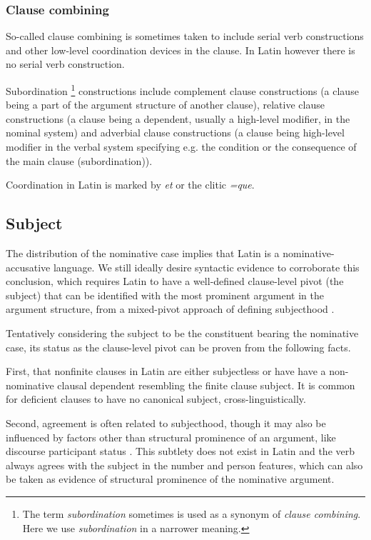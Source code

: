 \documentclass[a4paper, oneside, 12pt]{report}
\newcommand*{\term}[1]{\emph{#1}}
\newcommand{\form}[1]{\emph{#1}}
\begin{document}
\subsubsection{Clause combining}\label{sec:grammatical.clause.clause-combine}

So-called clause combining is sometimes taken to include serial verb constructions and other low-level coordination devices in the clause.
In Latin however there is no serial verb construction.

Subordination%
\footnote{
    The term \term{subordination} sometimes is used as a synonym of \term{clause combining}.
    Here we use \term{subordination} in a narrower meaning.
} constructions include complement clause constructions (a clause being a part of the argument structure of another clause), relative clause constructions (a clause being a dependent, usually a high-level modifier, in the nominal system) and adverbial clause constructions (a clause being high-level modifier in the verbal system specifying e.g. the condition or the consequence of the main clause (subordination)).

Coordination in Latin is marked by \form{et} or the clitic \form{=que}.


\subsection{Subject}\label{sec:grammatical.clause.subject} 

The distribution of the nominative case implies that Latin is a nominative-accusative language.
We still ideally desire syntactic evidence to corroborate this conclusion,
which requires Latin to have a well-defined clause-level pivot (the subject)
that can be identified with the most prominent argument in the argument structure,
from a mixed-pivot approach of defining subjecthood \citep{aldridge2008generative}.

Tentatively considering the subject to be the constituent bearing the nominative case,
its status as the clause-level pivot can be proven from the following facts.

First, that nonfinite clauses in Latin are either subjectless or have have a non-nominative clausal dependent resembling the finite clause subject.
It is common for deficient clauses to have no canonical subject, cross-linguistically.

Second, agreement is often related to subjecthood, though it may also be influenced by factors other than structural prominence of an argument,
like discourse participant status \citep{oxford2017inverse}.
This subtlety does not exist in Latin and the verb always agrees with the subject in the number and person features,
which can also be taken as evidence of structural prominence of the nominative argument.
\end{document}
